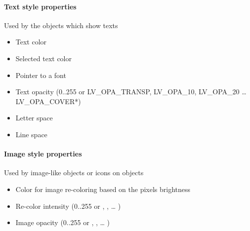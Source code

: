 \documentclass[letterpaper,10pt,english]{sphinxmanual}
\begin{document}
\paragraph{Text style properties}
\label{\detokenize{overview/styles:text-style-properties}}
Used by the objects which show texts
\begin{itemize}
\item {} 
 Text color

\item {} 
 Selected text color

\item {} 
 Pointer to a font

\item {} 
 Text opacity (0..255 or LV\_OPA\_TRANSP, LV\_OPA\_10, LV\_OPA\_20 … LV\_OPA\_COVER*)

\item {} 
 Letter space

\item {} 
 Line space

\end{itemize}


\paragraph{Image style properties}
\label{\detokenize{overview/styles:image-style-properties}}
Used by image-like objects or icons on objects
\begin{itemize}
\item {} 
 Color for image re-coloring based on the pixels brightness

\item {} 
 Re-color intensity (0..255 or , ,  … )

\item {} 
 Image opacity (0..255 or , ,  … )

\end{itemize}
\end{document}
